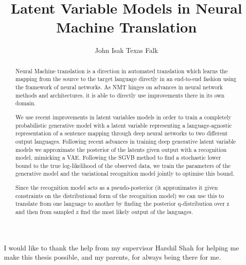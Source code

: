 \makeatletter
\renewcommand {\@degree@string} {Master of Science}
\makeatother

\title{Latent Variable Models in Neural Machine Translation}
\author{John Isak Texas Falk}

\maketitle
\makedeclaration

\begin{abstract} %
Neural Machine translation is a direction in automated translation which learns
the mapping from the source to the target language directly in an end-to-end
fashion using the framework of neural networks. As NMT hinges on advances in
neural network methods and architectures, it is able to directly use
improvements there in its own domain.

We use recent improvements in latent variables models in order to train a
completely probabilistic generative model with a latent variable representing a
language-agnostic representation of a sentence mapping through deep neural
networks to two different output languages. Following recent advances in
training deep generative latent variable models we approximate the posterior of
the latents given output with a recognition model, mimicking a VAE. Following
the SGVB method to find a stochastic lower bound to the true log-likelihood of
the observed data, we train the parameters of the generative model and the
variational recognition model jointly to optimise this bound.

Since the recognition model acts as a pseudo-posterior (it approximates it given
constraints on the distributional form of the recognition model) we can use this
to translate from one language to another by finding the posterior
q-distribution over z and then from sampled z find the most likely output of the
languages.
\end{abstract}

\begin{acknowledgements}
I would like to thank the help from my supervisor Harshil Shah for helping me
make this thesis possible, and my parents, for always being there for me.
\end{acknowledgements}

\setcounter{tocdepth}{2} 

\tableofcontents
\listoffigures
\listoftables